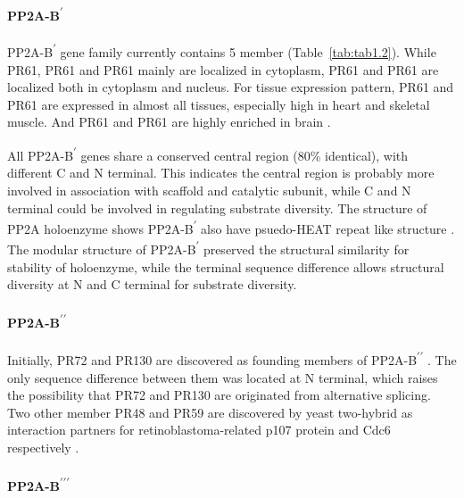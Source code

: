 \paragraph{PP2A-B\textsuperscript{$\prime$}}

PP2A-B\textsuperscript{$\prime$} gene family currently contains 5 member (Table~\ref{tab:tab1.2}). While PR61\textalpha{}, PR61\textbeta{} and PR61\textepsilon{} mainly are localized in cytoplasm, PR61\textgamma{} and PR61\textdelta{} are localized both in cytoplasm and nucleus. For tissue expression pattern, PR61\textalpha{} and PR61\textgamma{} are expressed in almost all tissues, especially high in heart and skeletal muscle. And PR61\textbeta{} and PR61\textdelta{} are highly enriched in brain \cite{csortos_high_1996,tehrani_identification_1996,tanabe_molecular_1996}.

All PP2A-B\textsuperscript{$\prime$} genes share a conserved central region (80\% identical), with different C and N terminal. This indicates the central region is probably more involved in association with scaffold and catalytic subunit, while C and N terminal could be involved in regulating substrate diversity. The structure of PP2A holoenzyme shows PP2A-B\textsuperscript{$\prime$} also have psuedo-HEAT repeat like structure \cite{cho_crystal_2007}. The modular structure of PP2A-B\textsuperscript{$\prime$} preserved the structural similarity for stability of holoenzyme, while the terminal sequence difference allows structural diversity at N and C terminal for substrate diversity. 

\paragraph{PP2A-B\textsuperscript{$\prime\prime$}}

Initially, PR72 and PR130 are discovered as founding members of PP2A-B\textsuperscript{$\prime\prime$} \cite{hendrix_structure_1993}. The only sequence difference between them was located at N terminal, which raises the possibility that PR72 and PR130 are originated from alternative splicing. Two other member PR48 and PR59 are discovered by yeast two-hybrid as interaction partners for retinoblastoma-related p107 protein and Cdc6 respectively \cite{voorhoeve_functional_1999,yan_pr48_2000}.

\paragraph{PP2A-B\textsuperscript{$\prime\prime\prime$}}

